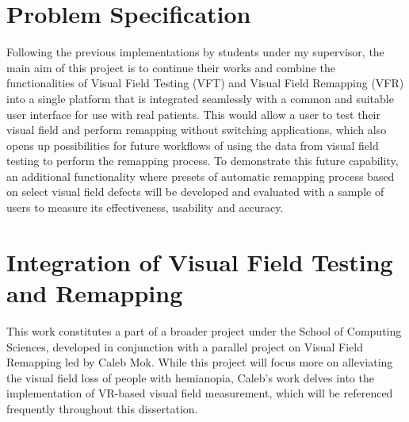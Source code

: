 \documentclass{l4proj}
\begin{document}


\section{Problem Specification}
Following the previous implementations by students under my supervisor, the main aim of this project is to continue their works and combine the functionalities of Visual Field Testing (VFT) and Visual Field Remapping (VFR) into a single platform that is integrated seamlessly with a common and suitable user interface for use with real patients. This would allow a user to test their visual field and perform remapping without switching applications, which also opens up possibilities for future workflows of using the data from visual field testing to perform the remapping process. To demonstrate this future capability, an additional functionality where presets of automatic remapping process based on select visual field defects will be developed and evaluated with a sample of users to measure its effectiveness, usability and accuracy.


\section{Integration of Visual Field Testing and Remapping}
This work constitutes a part of a broader project under the School of Computing Sciences, developed in conjunction with a parallel project on Visual Field Remapping led by Caleb Mok. While this project will focus more on alleviating the visual field loss of people with hemianopia,  Caleb’s work delves into the implementation of VR-based visual field measurement, which will be referenced frequently throughout this dissertation.
\end{document}
